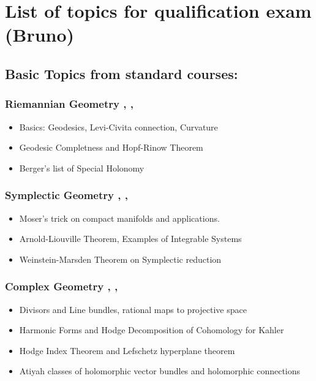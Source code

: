 \documentclass{article}
\author{BS}
\begin{document}
\section*{List of topics for qualification exam (Bruno)}
\subsection*{Basic Topics from standard courses:}
\subsubsection*{Riemannian Geometry \cite{docarmo}, \cite{besse2007einstein}, \cite{jost2008riemannian}}
\begin{itemize}
    \item Basics: Geodesics, Levi-Civita connection, Curvature
    \item Geodesic Completness and Hopf-Rinow Theorem
    \item Berger's list of Special Holonomy
\end{itemize}
\subsubsection*{Symplectic Geometry \cite{Arnold}, \cite{guillemin1990symplectic}, \cite{da2001lectures}}
\begin{itemize}
    \item Moser's trick on compact manifolds and applications.
    \item Arnold-Liouville Theorem, Examples of Integrable Systems
    \item Weinstein-Marsden Theorem on Symplectic reduction
\end{itemize}
\subsubsection*{Complex Geometry \cite{huybrechts2005complex}, \cite{griffiths2014principles}, \cite{Voisin_2002}}
\begin{itemize}
	\item Divisors and Line bundles, rational maps to projective space
	\item Harmonic Forms and Hodge Decomposition of Cohomology for Kahler
        \item Hodge Index Theorem and Lefschetz hyperplane theorem
	\item Atiyah classes of holomorphic vector bundles and holomorphic connections
\end{itemize}
\end{document}
